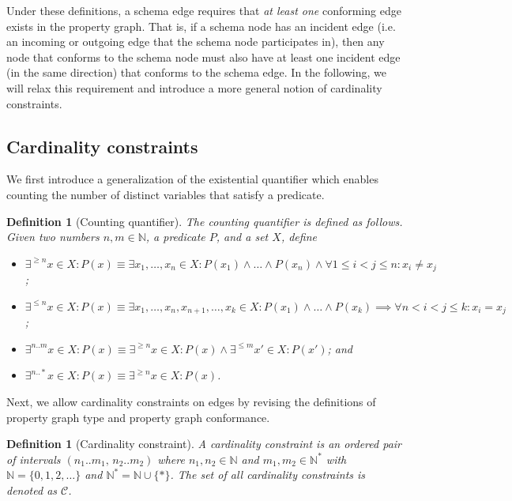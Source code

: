 \documentclass[a4paper]{article}
\newtheorem{definition}[theorem]{Definition}
\newcommand{\N}{\mathbb{N}}
\begin{document}
Under these definitions, a schema edge requires that \emph{at least one} conforming edge exists in the property graph. That is, if a schema node has an incident edge (i.e. an incoming or outgoing edge that the schema node participates in), then any node that conforms to the schema node must also have at least one incident edge (in the same direction) that conforms to the schema edge. In the following, we will relax this requirement and introduce a more general notion of cardinality constraints.

\subsection{Cardinality constraints}

We first introduce a generalization of the existential quantifier which enables counting the number of distinct variables that satisfy a predicate.

\begin{definition}[Counting quantifier]
  The \emph{counting quantifier} is defined as follows. Given two numbers $n, m \in \N$, a predicate $P$, and a set $X$, define
  \begin{itemize}
    \item $\exists^{\geq n} x \in X : P(x) \equiv \exists x_1, \ldots, x_n \in X : P(x_1) \wedge \ldots \wedge P(x_n) \wedge \forall 1 \leq i < j \leq n : x_i \neq x_j$;
    \item $\exists^{\leq n} x \in X : P(x) \equiv \exists x_1, \ldots, x_n, x_{n+1}, \ldots, x_k \in X : P(x_1) \wedge \ldots \wedge P(x_k) \implies \forall n < i < j \leq k : x_i = x_j$;
    \item $\exists^{n..m} x \in X : P(x) \equiv \exists^{\geq n} x \in X : P(x) \wedge \exists^{\leq m} x' \in X : P(x')$; and
    \item $\exists^{n..*} x \in X : P(x) \equiv \exists^{\geq n} x \in X : P(x)$.
  \end{itemize}
\end{definition}

Next, we allow cardinality constraints on edges by revising the definitions of property graph type and property graph conformance.

\begin{definition}[Cardinality constraint]
  A \emph{cardinality constraint} is an ordered pair of intervals $(n_1..m_1, \, n_2..m_2)$ where $n_1, n_2 \in \N$ and $m_1, m_2 \in \N^*$ with $\N = \{0, 1, 2, \ldots\}$ and $\N^* = \N \cup \{*\}$. The set of all cardinality constraints is denoted as $\mathcal{C}$.
\end{definition}
\end{document}
